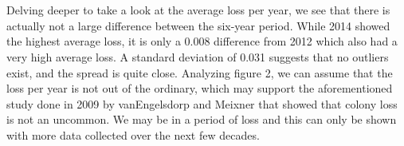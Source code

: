 \documentclass[11pt]{article}
\begin{document}
    \begin{center}
    \end{center}
    { \hspace*{\fill} \\}
    
    \begin{center}
    \end{center}
    { \hspace*{\fill} \\}
    
    Delving deeper to take a look at the average loss per year, we see that
there is actually not a large difference between the six-year period.
While 2014 showed the highest average loss, it is only a 0.008
difference from 2012 which also had a very high average loss. A standard
deviation of 0.031 suggests that no outliers exist, and the spread is
quite close. Analyzing figure 2, we can assume that the loss per year is
not out of the ordinary, which may support the aforementioned study done
in 2009 by vanEngelsdorp and Meixner that showed that colony loss is not
an uncommon. We may be in a period of loss and this can only be shown
with more data collected over the next few decades.
\end{document}
